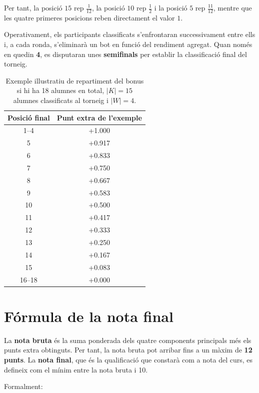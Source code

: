 Per tant, la posici\'o \(15\) rep \(\tfrac{1}{12}\), la posici\'o \(10\) rep \(\tfrac{1}{2}\) i la posici\'o \(5\) rep \(\tfrac{11}{12}\), mentre que les quatre primeres posicions reben directament el valor \(1\).

Operativament, els participants classificats s'enfrontaran successivament entre ells i, a cada ronda, s'eliminar\`a un bot en funci\'o del rendiment agregat. Quan nom\'es en quedin \textbf{4}, es disputaran unes \textbf{semifinals} per establir la classificaci\'o final del torneig.

\begin{table}[h]
  \centering
  \begin{tabular}{cc}
    \toprule
    \textbf{Posici\'o final} & \textbf{Punt extra de l'exemple} \\
    \midrule
    1--4 & +1.000 \\
    5 & +0.917 \\
    6 & +0.833 \\
    7 & +0.750 \\
    8 & +0.667 \\
    9 & +0.583 \\
    10 & +0.500 \\
    11 & +0.417 \\
    12 & +0.333 \\
    13 & +0.250 \\
    14 & +0.167 \\
    15 & +0.083 \\
    16--18 & +0.000 \\
    \bottomrule
  \end{tabular}
  \caption{Exemple il\textperiodcentered lustratiu de repartiment del bonus si hi ha 18 alumnes en total, \(|K|=15\) alumnes classificats al torneig i \(|W|=4\).}
  \label{tab:bonus-torneig-exemple}
\end{table}

\section{F\'ormula de la nota final}

La \textbf{nota bruta} \'es la suma ponderada dels quatre components principals m\'es els punts extra obtinguts. Per tant, la nota bruta pot arribar fins a un m\`axim de \textbf{12 punts}. La \textbf{nota final}, que \'es la qualificaci\'o que constar\`a com a nota del curs, es defineix com el m\'inim entre la nota bruta i 10.

Formalment:

